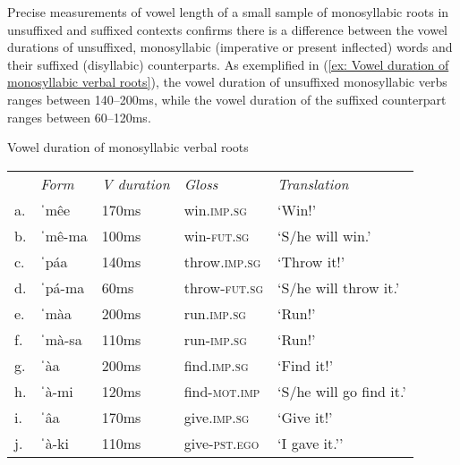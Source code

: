     \z
\z

Precise measurements of vowel length of a small sample of monosyllabic roots in unsuffixed and suffixed contexts confirms there is a difference between the vowel durations of unsuffixed, monosyllabic (imperative or present inflected) words and their suffixed (disyllabic) counterparts. As exemplified in (\ref{ex: Vowel duration of monosyllabic verbal roots}), the vowel duration of unsuffixed monosyllabic verbs ranges between 140--200ms, while the vowel duration of the suffixed counterpart ranges between 60--120ms.

\pagebreak

\ea\label{ex: Vowel duration of monosyllabic verbal roots}
{Vowel duration of monosyllabic verbal roots }

\begin{tabular}{lllll}
       & \textit{Form} & \textit{V duration} & \textit{Gloss}  & \textit{Translation} \\
     a.& {ˈmêe}  & 170ms & win.\textsc{imp.sg}	&  ‘Win!'\\
     b.& {ˈmê-ma} & 100ms &  win-\textsc{fut.sg} & `S/he will win.'\\
     c.& {ˈpáa} & 140ms & throw.\textsc{imp.sg} & ‘Throw it!' \\
     d.& {ˈpá-ma} & 60ms & throw-\textsc{fut.sg} & `S/he will throw it.' \\
     e.& {ˈmàa} 	& 200ms &  run.\textsc{imp.sg} & ‘Run!’  \\
     f.& {ˈmà-sa} 	& 110ms &  run-\textsc{imp.sg} & ‘Run!’ \\
     g.& {ˈàa} 	& 200ms & find.\textsc{imp.sg} & `Find it!’   \\
     h.& {ˈà-mi} 	& 120ms & find-\textsc{mot.imp} & `S/he will go find it.'  \\
     i.& {ˈâa} 	& 170ms &  give.\textsc{imp.sg} & ‘Give it!’   \\
     j.& {ˈà-ki} 	& 110ms & give-\textsc{pst.ego} & `I gave it.'’   \\
\end{tabular}
    \z

